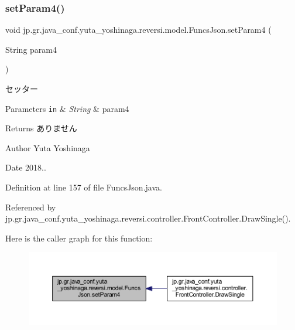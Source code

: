 \subsubsection{\texorpdfstring{set\+Param4()}{setParam4()}}
{\footnotesize\ttfamily void jp.\+gr.\+java\+\_\+conf.\+yuta\+\_\+yoshinaga.\+reversi.\+model.\+Funcs\+Json.\+set\+Param4 (\begin{DoxyParamCaption}\item[{String}]{param4 }\end{DoxyParamCaption})}



セッター 


\begin{DoxyParams}[1]{Parameters}
\mbox{\tt in}  & {\em String} & param4 \\
\hline
\end{DoxyParams}
\begin{DoxyReturn}{Returns}
ありません 
\end{DoxyReturn}
\begin{DoxyAuthor}{Author}
Yuta Yoshinaga 
\end{DoxyAuthor}
\begin{DoxyDate}{Date}
2018.. 
\end{DoxyDate}


Definition at line 157 of file Funcs\+Json.\+java.



Referenced by jp.\+gr.\+java\+\_\+conf.\+yuta\+\_\+yoshinaga.\+reversi.\+controller.\+Front\+Controller.\+Draw\+Single().

Here is the caller graph for this function\+:\nopagebreak
\begin{figure}[H]
\begin{center}
\leavevmode
\includegraphics[width=350pt]{classjp_1_1gr_1_1java__conf_1_1yuta__yoshinaga_1_1reversi_1_1model_1_1_funcs_json_a44af51970635551127a296e3c07db7ec_icgraph}
\end{center}
\end{figure}
\mbox{\label{classjp_1_1gr_1_1java__conf_1_1yuta__yoshinaga_1_1reversi_1_1model_1_1_funcs_json_a020f9dc27e5d795a0554ee1fda117797}} 
